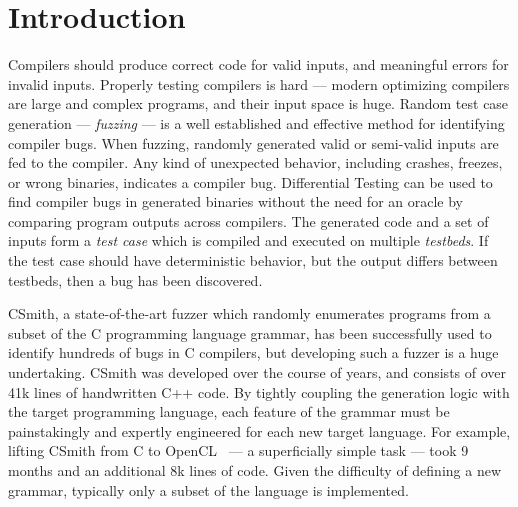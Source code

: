 \section{Introduction}

Compilers should produce correct code for valid inputs, and meaningful errors
for invalid inputs. Properly testing compilers is hard --- modern optimizing
compilers are large and complex programs, and their input space is huge. Random
test case generation --- \emph{fuzzing} --- is a well established and effective
method for identifying compiler bugs. When fuzzing, randomly generated valid or
semi-valid inputs are fed to the compiler. Any kind of unexpected behavior,
including crashes, freezes, or wrong binaries, indicates a compiler bug.
Differential Testing can be used to find compiler bugs in generated binaries
without the need for an oracle by comparing program outputs across compilers.
The generated code and a set of inputs form a \emph{test case} which is
compiled and executed on multiple \emph{testbeds}. If the test case should have
deterministic behavior, but the output differs between testbeds, then a bug has
been discovered.

CSmith, a state-of-the-art fuzzer which randomly enumerates programs from a
subset of the C programming language grammar, has been successfully used to
identify hundreds of bugs in C compilers, but developing such a fuzzer is a
huge undertaking. CSmith was developed over the course of years, and consists
of over 41k lines of handwritten C++ code. By tightly coupling the generation
logic with the target programming language, each feature of the grammar must be
painstakingly and expertly engineered for each new target language. For
example, lifting CSmith from C to OpenCL~\cite{Lidbury2015a} --- a
superficially simple task --- took 9 months and an additional 8k lines of code.
Given the difficulty of defining a new grammar, typically only a subset of the
language is implemented.

